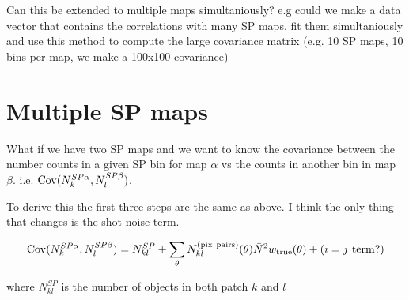 \documentclass[12pt]{article}
\begin{document}
Can this be extended to multiple maps simultaniously? e.g could we make a data vector that contains the correlations with many SP maps, fit them simultaniously and use this method to compute the large covariance matrix (e.g. 10 SP maps, 10 bins per map, we make a 100x100 covariance)

\section{Multiple SP maps}

What if we have two SP maps and we want to know the covariance between the number counts in a given SP bin for map $\alpha$ vs the counts in another bin in map $\beta$. i.e. ${\bf {\rm Cov}}(N^{SP\alpha}_k, N^{SP\beta}_l)$.

To derive this the first three steps are the same as above. I think the only thing that changes is the shot noise term.

\begin{equation}
{\bf {\rm Cov}}(N^{SP\alpha}_k, N^{SP\beta}_l) = N^{SP}_{kl} + \sum_{\theta} N^{\rm (pix \ pairs)}_{kl}(\theta) {\bar N}^2 w_{\rm true}(\theta) + {(i=j \ \rm term?)}
\end{equation}

where $N^{SP}_{kl}$ is the number of objects in both patch $k$ and $l$
\end{document}
